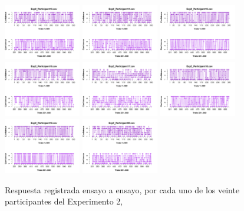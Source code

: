 \begin{figure}[th]
\includegraphics[width=0.30\textwidth]{Figures/Rating_Exp2_P13} \includegraphics[width=0.30\textwidth]{Figures/Rating_Exp2_P14} \includegraphics[width=0.30\textwidth]{Figures/Rating_Exp2_P15}
\includegraphics[width=0.30\textwidth]{Figures/Rating_Exp2_P16} \includegraphics[width=0.30\textwidth]{Figures/Rating_Exp2_P17} \includegraphics[width=0.30\textwidth]{Figures/Rating_Exp2_P18}
\includegraphics[width=0.30\textwidth]{Figures/Rating_Exp2_P19} \includegraphics[width=0.30\textwidth]{Figures/Rating_Exp2_P20} 
\caption[Rating_Exp2]{Respuesta registrada ensayo a ensayo, por cada uno de los veinte participantes del Experimento 2, }
\label{fig:Rating_E2}
\end{figure}
